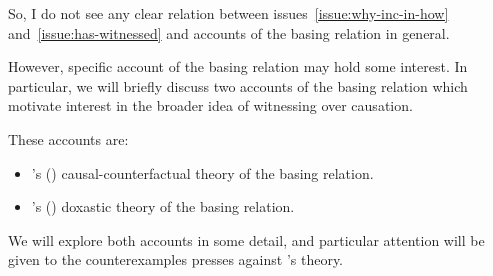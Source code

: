 \begin{note}
  So, I do not see any clear relation between issues~\ref{issue:why-inc-in-how} and~\ref{issue:has-witnessed} and accounts of the basing relation in general.

  However, specific account of the basing relation may hold some interest.
  In particular, we will briefly discuss two accounts of the basing relation which motivate interest in the broader idea of witnessing over causation.

  These accounts are:
  \begin{itemize}
  \item
    \citeauthor{Swain:1981wd}'s (\citeyear{Swain:1981wd}) causal-counterfactual theory of the basing relation.
  \item
    \citeauthor{Tolliver:1982us}'s (\citeyear{Tolliver:1982us}) doxastic theory of the basing relation.
  \end{itemize}
  We will explore both accounts in some detail, and particular attention will be given to the counterexamples \citeauthor{Tolliver:1982us} presses against \citeauthor{Swain:1981wd}'s theory.
\end{note}

\paragraph*{\citeauthor{Swain:1981wd}}

